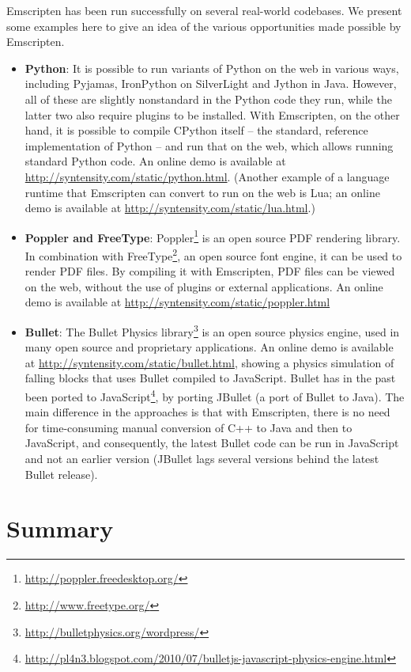 \documentclass[preprint,10pt]{sigplanconf}
\begin{document}
Emscripten has been run successfully on several real-world codebases. We present
some examples here to give an idea of the various opportunities made possible
by Emscripten.
\begin{itemize}
\item \textbf{Python}: It is possible to run variants of Python on
the web in various ways, including Pyjamas, IronPython on SilverLight and
Jython in Java. However, all of these are slightly nonstandard in the
Python code they run, while the latter two also require plugins to be
installed. With Emscripten, on the other hand, it is possible to compile
CPython itself -- the standard, reference implementation of Python -- and
run that on the web, which allows running standard Python code. An online
demo is available at \url{http://syntensity.com/static/python.html}.
(Another example of a language runtime that Emscripten can convert to run
on the web is Lua; an online demo is available at \url{http://syntensity.com/static/lua.html}.)
\item \textbf{Poppler and FreeType}: Poppler\footnote{\url{http://poppler.freedesktop.org/}} is an open source PDF
rendering library. In combination with FreeType\footnote{\url{http://www.freetype.org/}}, an open source font
engine, it can be used to render PDF files. By compiling it with Emscripten,
PDF files can be viewed on the web, without the use of plugins or external
applications. An online demo is available at \url{http://syntensity.com/static/poppler.html}
\item \textbf{Bullet}: The Bullet Physics library\footnote{\url{http://bulletphysics.org/wordpress/}} is
an open source physics engine, used in many open source and proprietary applications. An online
demo is available at \url{http://syntensity.com/static/bullet.html}, showing a physics
simulation of falling blocks that uses Bullet compiled to JavaScript. Bullet has in the
past been ported to JavaScript\footnote{\url{http://pl4n3.blogspot.com/2010/07/bulletjs-javascript-physics-engine.html}}, by porting JBullet (a port of Bullet to Java). The main difference in the approaches is that with Emscripten, there is no need for
time-consuming manual conversion of C++ to Java and then to JavaScript, and consequently,
the latest Bullet code can be run in JavaScript and not an earlier version (JBullet lags
several versions behind the latest Bullet release).
\end{itemize}

\section{Summary}
\label{sec:summary}
\end{document}
